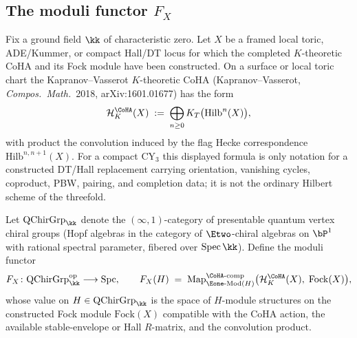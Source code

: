 \subsection*{The moduli functor \texorpdfstring{$F_X$}{F-X}}

Fix a ground field $\kk$ of characteristic zero. Let \(X\) be a framed
local toric, ADE/Kummer, or compact Hall/DT locus for which the
completed \(K\)-theoretic CoHA and its Fock module have been
constructed. On a surface or local toric chart the Kapranov--Vasserot
\(K\)-theoretic CoHA (Kapranov--Vasserot, \emph{Compos.\ Math.}\ 2018,
arXiv:1601.01677) has the form
\[
 \mathcal H^{\CoHA}_K(X) \;:=\; \bigoplus_{n \geq 0} K_T\bigl(\mathrm{Hilb}^n(X)\bigr),
\]
with product the convolution induced by the flag Hecke correspondence
\(\mathrm{Hilb}^{n,n+1}(X)\). For a compact CY$_3$ this displayed
formula is only notation for a constructed DT/Hall replacement carrying
orientation, vanishing cycles, coproduct, PBW, pairing, and completion
data; it is not the ordinary Hilbert scheme of the threefold.

\begin{definition}
\label{def:qgf-F-X}
Let $\mathrm{QChirGrp}_\kk$ denote the $(\infty,1)$-category of presentable quantum vertex chiral groups (Hopf algebras in the category of $\Etwo$-chiral algebras on $\bP^1$ with rational spectral parameter, fibered over $\mathrm{Spec}\,\kk$). Define the moduli functor
\[
 F_X \colon \mathrm{QChirGrp}_\kk^{\mathrm{op}} \longrightarrow \mathrm{Spc},
 \qquad
 F_X(H) \;=\; \mathrm{Map}^{\CoHA\text{-}\mathrm{comp}}_{\Eone\text{-}\mathrm{Mod}(H)}\bigl(\mathcal H^{\CoHA}_K(X),\; \mathrm{Fock}(X)\bigr),
\]
whose value on \(H \in \mathrm{QChirGrp}_\kk\) is the space of
\(H\)-module structures on the constructed Fock module
\(\mathrm{Fock}(X)\) compatible with the CoHA action, the available
stable-envelope or Hall \(R\)-matrix, and the convolution product.
\end{definition}

